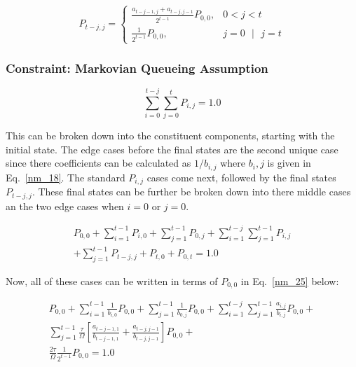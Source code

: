 \documentclass[conference]{IEEEtran}
\begin{document}
\begin{equation}
  P_{t-j,j} =
    \begin{cases}
      \frac{a_{t-j-1,j} + a_{t-j,j-1}}{2^{t-1}}P_{0,0},                            & 0 < j < t \\
      \frac{1}{2^{t-1}}P_{0,0},  & j = 0 \text{ } |\text{ } j = t
    \end{cases}
    \label{nm_22}
\end{equation}

\subsubsection{Constraint: Markovian Queueing Assumption}

\begin{equation}
  \sum_{i=0}^{t-j}{\sum_{j=0}^{t}{P_{i,j}}} = 1.0\label{nm_23}
\end{equation}

This can be broken down into the constituent components, starting with the
initial state. The edge cases before the final states are the second unique case
since there coefficients can be calculated as $1/b_{i,j}$ where $b_i,j$ is given in 
Eq.~\ref{nm_18}. The standard $P_{i,j}$ cases come next, followed by the final
states $P_{t-j,j}$. These final states can be further be broken down into there 
middle cases an the two edge cases when $i = 0$ or $j = 0$. 

\begin{multline}
  P_{0,0} +  \sum_{i = 1}^{t-1}{P_{i,0}} + \sum_{j = 1}^{t-1}{P_{0,j}} + \sum_{i=1}^{t-j}{\sum_{j=1}^{t-1}{P_{i,j}}} \\
  + \sum_{j=1}^{t-1}{P_{t-j,j}} + P_{t, 0} + P_{0, t} = 1.0 \label{nm_24}
\end{multline}

Now, all of these cases can be written in terms of $P_{0,0}$ in Eq.~\ref{nm_25} below:

\begin{multline}
  P_{0,0} +  \sum_{i = 1}^{t-1}{\frac{1}{b_{i,0}}P_{0,0}} + \sum_{j = 1}^{t-1}{\frac{1}{b_{0,j}}P_{0,0}} + 
  \sum_{i=1}^{t-j}{\sum_{j=1}^{t-1}{\frac{a_{i,j}}{b_{i,j}}P_{0,0}}} + \\
  \sum_{j=1}^{t-1}{\frac{\tau}{\Omega}\left[\frac{a_{t-j-1,1}}{b_{t-j-1,1}} + \frac{a_{t-j,j-1}}{b_{t-j,j-1}}\right]P_{0,0}} + \\
  \frac{2\tau}{\Omega}\frac{1}{2^{t-1}}P_{0,0} = 1.0 \label{nm_25}
\end{multline}
\end{document}
